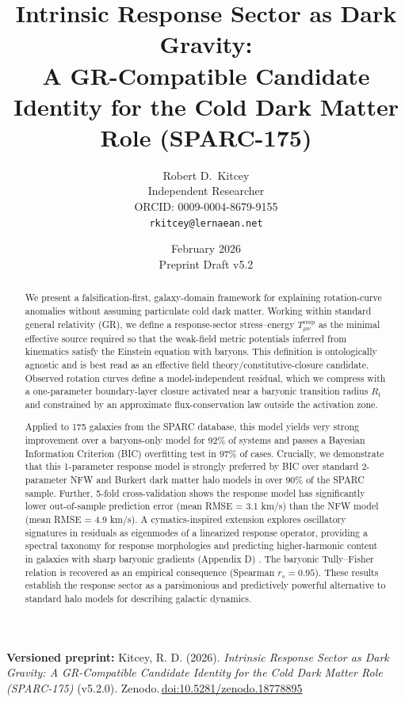 \documentclass[11pt]{article}
\title{Intrinsic Response Sector as Dark Gravity:\\
\large A GR-Compatible Candidate Identity for the Cold Dark Matter Role (SPARC-175)}
\author{Robert D.\ Kitcey\\
\normalsize Independent Researcher\\
\normalsize ORCID: 0009-0004-8679-9155\\
\normalsize \texttt{rkitcey@lernaean.net}}
\date{February 2026\\Preprint Draft v5.2}
\begin{document}
\maketitle

\noindent\textbf{Versioned preprint:} Kitcey, R. D. (2026). \emph{Intrinsic Response Sector as Dark Gravity: A GR-Compatible Candidate Identity for the Cold Dark Matter Role (SPARC-175)} (v5.2.0). Zenodo.\,\href{https://doi.org/10.5281/zenodo.18778895}{doi:10.5281/zenodo.18778895}

\begin{abstract}
We present a falsification-first, galaxy-domain framework for explaining rotation-curve anomalies without assuming particulate cold dark matter. Working within standard general relativity (GR), we define a response-sector stress--energy \(T_{\mu\nu}^{\mathrm{resp}}\) as the minimal effective source required so that the weak-field metric potentials inferred from kinematics satisfy the Einstein equation with baryons. This definition is ontologically agnostic and is best read as an effective field theory/constitutive-closure candidate. Observed rotation curves define a model-independent residual, which we compress with a one-parameter boundary-layer closure activated near a baryonic transition radius \(R_{t}\) and constrained by an approximate flux-conservation law outside the activation zone.

Applied to 175 galaxies from the SPARC database, this model yields very strong improvement over a baryons-only model for 92\% of systems and passes a Bayesian Information Criterion (BIC) overfitting test in 97\% of cases. Crucially, we demonstrate that this 1-parameter response model is strongly preferred by BIC over standard 2-parameter NFW and Burkert dark matter halo models in over 90\% of the SPARC sample. Further, 5-fold cross-validation shows the response model has significantly lower out-of-sample prediction error (mean RMSE = 3.1 km/s) than the NFW model (mean RMSE = 4.9 km/s). A cymatics-inspired extension explores oscillatory signatures in residuals as eigenmodes of a linearized response operator, providing a spectral taxonomy for response morphologies and predicting higher-harmonic content in galaxies with sharp baryonic gradients (Appendix D) \citep{Rossing1982Chladni, Tuan2014Nodal, BenderOrszag1999}. The baryonic Tully--Fisher relation is recovered as an empirical consequence (Spearman \(r_{s} = 0.95\)). These results establish the response sector as a parsimonious and predictively powerful alternative to standard halo models for describing galactic dynamics.
\end{abstract}
\end{document}
